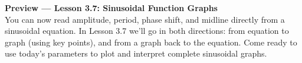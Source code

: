 \documentclass[10pt]{article}
\begin{document}
\vspace{0.08in}

\begin{tcolorbox}[colback=navylight, colframe=navy, arc=2mm,
    left=3mm, right=3mm, top=2mm, bottom=2mm]
\small\textbf{Preview --- Lesson 3.7: Sinusoidal Function Graphs}\\
You can now read amplitude, period, phase shift, and midline directly from
a sinusoidal equation. In Lesson 3.7 we'll go in both directions: from
equation to graph (using key points), and from a graph back to the equation.
Come ready to use today's parameters to plot and interpret complete sinusoidal graphs.
\end{tcolorbox}
\end{document}
